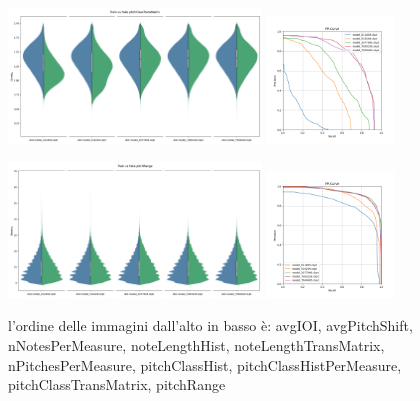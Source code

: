 \begin{figure}[!ht]
    \centering
    \includegraphics[width=0.6\textwidth]{../images/realworldexperiments/scarlatti/violinplots/TrainVsFake_pitchClassTransMatrix.png}
    \includegraphics[width=0.3\textwidth]{../images/realworldexperiments/scarlatti/prcurves/PRCurveScarlatti_pitchClassTransMatrix.png}
\end{figure}
\begin{figure}[!ht]
    \label{fig:realworldexperiments-scarlatti-fake}
    \centering
    \includegraphics[width=0.6\textwidth]{../images/realworldexperiments/scarlatti/violinplots/TrainVsFake_pitchRange.png}
    \includegraphics[width=0.3\textwidth]{../images/realworldexperiments/scarlatti/prcurves/PRCurveScarlatti_pitchRange.png}
    \caption{l'ordine delle immagini dall'alto in basso è: avgIOI, avgPitchShift, nNotesPerMeasure, noteLengthHist, noteLengthTransMatrix, nPitchesPerMeasure, pitchClassHist, pitchClassHistPerMeasure, pitchClassTransMatrix, pitchRange}
\end{figure}

